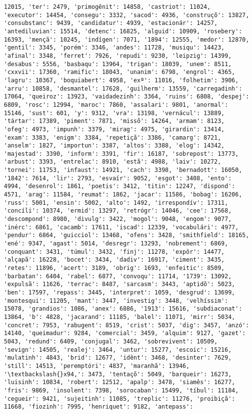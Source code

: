 \documentclass[11pt]{article}
\begin{document}
\begin{Verbatim}[commandchars=\\\{\}]
12015, 'ter': 2479, 'primogênit': 14858, 'castriot': 11024, 'executor': 14454, 'consegu': 3332, 'sacod': 4936, 'construçõ': 13827, 'consubstanc': 9439, 'candidatur': 4939, 'estacionár': 14257, 'antediluvian': 15514, 'detenc': 16825, 'alguid': 10909, 'rosebery': 16393, 'mençã': 10245, 'indígen': 7071, '1894': 12555, 'medor': 12870, 'gentil': 3345, 'porém': 3346, 'andes': 11728, 'musiqu': 14423, 'afinal': 3348, 'ferret': 7926, 'repudi': 9230, 'leipzig': 14399, 'desabus': 5556, 'basbaqu': 13964, 'trigan': 18039, 'unem': 8511, 'cxxvii': 17360, 'ramific': 18043, 'unanim': 6798, 'engrol': 4365, 'lagru': 10367, 'boquiabert': 4958, 'exª': 11016, 'folhetim': 3906, 'arru': 10858, 'desmantel': 17628, 'guilherm': 13559, 'carregadinh': 17064, 'queiroz': 13923, 'vaidadezinh': 3364, 'ruins': 6808, 'despej': 6809, 'rosc': 12994, 'maroc': 7860, 'assalari': 9801, 'anormal': 15146, 'sust': 601, 'y': 9312, 'vra': 13198, 'vernácul': 13889, 'tártar': 17389, 'piment': 7871, 'missõ': 14264, 'armam': 8123, 'ofeg': 4973, 'impunh': 3379, 'mirag': 4975, 'girardin': 13414, 'exam': 3383, 'enigm': 3384, 'repetiçã': 3386, 'camarg': 8721, 'anselm': 1827, 'importun': 3387, 'altos': 3388, 'elog': 14342, 'majestad': 3390, 'inform': 3391, 'fir': 16187, 'sobrepost': 13773, 'arbust': 3393, 'entrelac': 8910, 'estã': 4988, 'laiv': 10272, 'tornei': 11753, 'infaust': 14921, 'cach': 3398, 'bernadott': 16050, '1842': 7614, 'lir': 2793, 'esvaír': 9052, 'esgot': 3408, 'ento': 4994, 'desenrol': 1861, 'poetis': 3412, 'titin': 12247, 'dispond': 4571, 'arag': 11584, 'reumat': 1862, 'jacar': 11586, 'bobag': 16206, 'russ': 5001, 'ensin': 5002, 'alto': 1492, 'irrespondív': 17311, 'concíli': 10374, 'ermid': 13297, 'retrógr': 14046, 'cee': 17568, 'descompond': 8980, 'divulg': 3422, 'mogol': 9048, 'engom': 9077, 'inérc': 6861, 'cacamb': 17611, 'iscad': 12339, 'vocabulári': 4977, 'pendur': 6864, 'guicciol': 13468, 'ofens': 3428, 'smithfield': 18165, 'ené': 9347, 'agast': 5014, 'desregr': 13293, 'nobrement': 6869, 'conquant': 3431, 'túmul': 3432, 'finj': 11278, 'expôr': 14477, 'alçapã': 16228, 'bocet': 3434, 'dadiv': 16917, 'ciment': 3435, 'retes': 11896, 'acert': 3189, 'obrig': 1693, 'enfeitic': 8509, 'barbatan': 6404, 'rabel': 6877, 'convoqu': 11714, '1739': 13092, 'expulsã': 11626, 'terrac': 8487, 'sarcasm': 3443, 'aptidõ': 5023, 'ben': 17597, 'repass': 3445, 'interpret': 1059, 'desgrud': 13699, 'montesqui': 11205, 'mant': 3447, 'investig': 3448, 'velhíssim': 15078, 'grandios': 1086, 'anex': 6886, '1913': 15616, 'subdiaconat': 13864, 'b': 4828, 'jacarand': 11185, 'balel': 11071, 'mirr': 5034, 'concret': 7953, 'rabugent': 8519, 'crist': 5037, 'dig': 3457, 'anzó': 14140, 'queimadur': 9284, 'comercial': 3459, 'alquim': 9127, 'gazet': 5043, 'redund': 6409, 'conjugal': 3462, 'sobrevivent': 10509, 'sevign': 14505, 'realej': 3464, 'untur': 15277, 'escoic': 15216, 'mulatinh': 4843, 'brid': 12677, 'idênt': 3468, 'desinter': 7629, 'still': 14513, 'peremptóri': 4837, 'maranhã': 13946, '\textbackslash{}x94,': 3473, 'tentaçõ': 5049, 'barqueir': 16273, 'luisinh': 10834, 'robert': 12512, 'apalp': 3478, 'siamês': 16277, 'fris': 9869, 'insolent': 7398, 'sorocaban': 15499, 'tíbul': 11184, 'cegueir': 9421, 'sujeitinh': 11085, 'treplic': 11276, 'proibiçã': 11668, 'fiozinh': 7995, 'henriquet': 9182, 'antepass': 
\end{Verbatim}
\end{document}
